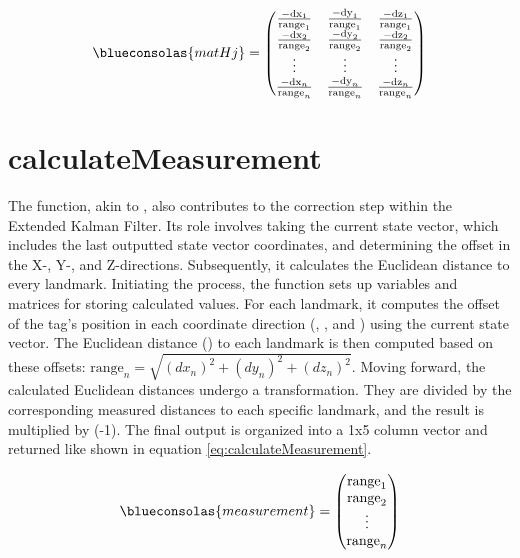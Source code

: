 \begin{equation}
	\begin{centering}
		\blueconsolas{matHj} =
		\begin{pmatrix}
			\frac{-\textrm{dx}_1}{\textrm{range}_1} & \frac{-\textrm{dy}_1}{\textrm{range}_1} & \frac{-\textrm{dz}_1}{\textrm{range}_1} \\
			\frac{-\textrm{dx}_2}{\textrm{range}_2} & \frac{-\textrm{dy}_2}{\textrm{range}_2} & \frac{-\textrm{dz}_2}{\textrm{range}_2} \\
			\vdots & \vdots & \vdots \\
			\frac{-\textrm{dx}_n}{\textrm{range}_n} & \frac{-\textrm{dy}_n}{\textrm{range}_n} & \frac{-\textrm{dz}_n}{\textrm{range}_n} \\
		\end{pmatrix}
	\end{centering}
	\label{eq:matHj}
\end{equation}

\section{calculateMeasurement}
\label{sub:calculateMeasurement}
The  function, akin to , also contributes to the correction step within the Extended Kalman Filter. 
Its role involves taking the current state vector, which includes the last outputted state vector coordinates, and determining the offset in the X-, Y-, and Z-directions. Subsequently, it calculates the Euclidean distance to every landmark.
\vspace{4pt}
\newline
Initiating the process, the function sets up variables and matrices for storing calculated values. For each landmark, it computes the offset of the tag's position in each coordinate direction (, , and ) using the current state vector. The Euclidean distance () to each landmark is then computed based on these offsets:
$\textrm{range}_n = \sqrt{(dx_n)^2 + (dy_n)^2 + (dz_n)^2}$.
Moving forward, the calculated Euclidean distances undergo a transformation. They are divided by the corresponding measured distances to each specific landmark, and the result is multiplied by (-1). The final output is organized into a 1x5 column vector and returned like shown in equation \ref{eq:calculateMeasurement}. 

\begin{equation}
	\begin{centering}
		\blueconsolas{measurement} =
		\begin{pmatrix}
			\textrm{range}_1 \\
			\textrm{range}_2 \\
			\vdots \\
			\textrm{range}_n 
		\end{pmatrix}
	\end{centering}
	\label{eq:calculateMeasurement}
\end{equation}
